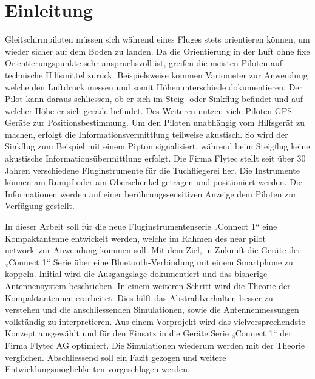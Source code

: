 \newpage
\section{Einleitung}
Gleitschirmpiloten müssen sich während eines Fluges stets orientieren können, um wieder sicher auf dem Boden zu landen. Da die Orientierung in der Luft ohne fixe Orientierungspunkte sehr anspruchsvoll ist, greifen die meisten Piloten auf technische Hilfsmittel zurück. Beispielsweise kommen Variometer zur Anwendung welche den Luftdruck messen und somit Höhenunterschiede dokumentieren. Der Pilot kann daraus schliessen, ob er sich im Steig- oder Sinkflug befindet und auf welcher Höhe er sich gerade befindet. Des Weiteren nutzen viele Piloten GPS-Geräte zur Positionsbestimmung. Um den Piloten unabhängig vom Hilfsgerät zu machen, erfolgt die Informationsvermittlung teilweise akustisch. So wird der Sinkflug zum Beispiel mit einem Pipton signalisiert, während beim Steigflug keine akustische Informationsübermittlung erfolgt. Die Firma Flytec stellt seit über 30 Jahren verschiedene Fluginstrumente für die Tuchfliegerei her. Die Instrumente können am Rumpf oder am Oberschenkel getragen und positioniert werden. Die Informationen werden auf einer berührungssensitiven Anzeige dem Piloten zur Verfügung gestellt. 

In dieser Arbeit soll für die neue Fluginstrumentenserie „Connect 1“ eine Kompaktantenne entwickelt werden, welche im Rahmen des \glqq near pilot network\grqq \ zur Anwendung kommen soll. Mit dem Ziel, in Zukunft die Geräte der „Connect 1“ Serie über eine Bluetooth-Verbindung mit einem Smartphone zu koppeln. Initial wird die Ausgangslage dokumentiert und das bisherige Antennensystem beschrieben. In einem weiteren Schritt wird die Theorie der Kompaktantennen erarbeitet. Dies hilft   das Abstrahlverhalten besser zu verstehen und die anschliessenden Simulationen, sowie die Antennenmessungen vollständig zu interpretieren. Aus einem Vorprojekt wird das vielversprechendste Konzept ausgewählt und für den Einsatz in die Geräte Serie „Connect 1“ der Firma Flytec AG optimiert. Die Simulationen wiederum werden mit der Theorie verglichen. Abschliessend soll ein Fazit gezogen und weitere Entwicklungsmöglichkeiten vorgeschlagen werden.





